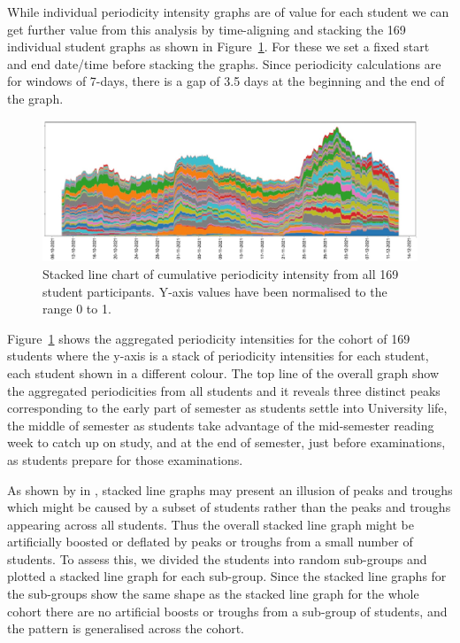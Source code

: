 \documentclass[preprints,article,accept,pdftex,moreauthors]{Definitions/mdpi}
\begin{document}
{While individual periodicity intensity graphs are of value for each student we can get further value from this analysis by time-aligning and stacking the 169 individual student graphs as shown in Figure~\ref{fig:All-student-participants}.
For these we set a fixed start and end date/time before {stacking} the graphs. Since periodicity calculations are for windows of 7-days, there is a gap of 3.5 days at the beginning and the end of the graph. 

\begin{figure}[H]
\centering
\includegraphics[width=\linewidth,height=0.25\textheight]{cmltv_prdcty.png}
\caption{Stacked line chart of cumulative periodicity intensity from all 169 student participants. {Y-axis values have been normalised to the range 0 to 1.}\label{fig:All-student-participants}}
\end{figure}   

Figure~\ref{fig:All-student-participants} shows the aggregated periodicity intensities for the  cohort of 169 students where the y-axis is a stack of periodicity intensities for each student, each student shown in a different colour. The top line of the overall graph show the aggregated periodicities from all students and it reveals three distinct peaks corresponding to the early part of semester as students settle into University life, the middle of semester as students take advantage of the mid-semester reading week to catch up on study, and at the end of semester, just before examinations, as students prepare for those examinations.

As shown by \citeauthor{byron2008stacked} in \cite{byron2008stacked}, stacked line graphs may present an illusion of peaks and troughs which might be caused by  a subset of students rather than {the peaks and troughs appearing} across all {students}. Thus the overall stacked line graph might be artificially boosted or deflated by peaks or troughs from a small number of students. To assess this, we divided the students into random sub-groups and plotted a stacked line graph for each sub-group. Since the stacked line graphs for the sub-groups show the same shape as the stacked line graph for the whole cohort there {are} no artificial boosts or troughs from a sub-group {of students}, and the pattern is generalised across the cohort.

}
\end{document}
